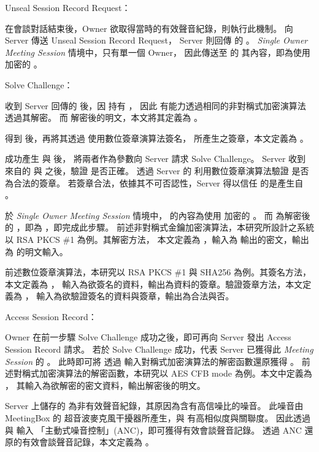 \begin{steps}
    \item Unseal Session Record Request：

            在會談對話結束後，Owner 欲取得當時的有效聲音紀錄，則執行此機制。
        \DEFowner 向 Server 傳送 Unseal Session Record Request，
        Server 則回傳 \DEFowner 的 \DEFakEnc。
        {\it Single Owner Meeting Session} 情境中，只有單一個 Owner，
        因此傳送至 \DEFowner 的 \DEFakEnc 其內容，即為使用 \DEFfuncEncPK 加密的 \DEFunsealKey。

    \item Solve Challenge：

            \DEFowner 收到 Server 回傳的 \DEFakEnc 後，因 \DEFowner 持有 \DEFprivateKey，
        因此 \DEFowner 有能力透過相同的非對稱式加密演算法透過其解密。
        而 \DEFakEnc 解密後的明文，本文將其定義為 \DEFakEncDec。

            得到 \DEFakEncDec 後，\DEFowner 再將其透過 \DEFprivateKey 使用數位簽章演算法簽名，
        所產生之簽章，本文定義為 \DEFakEncDecSig。

            \DEFowner 成功產生 \DEFakEncDec 與 \DEFakEncDecSig 後，
        將兩者作為參數向 Server 請求 Solve Challenge。
        Server 收到來自\DEFowner 的 \DEFakEncDec 與 \DEFakEncDecSig 之後，驗證 \DEFakEncDecSig 是否正確。
        透過 Server 的 \DEFpublicKey 利用數位簽章演算法驗證 \DEFakEncDecSig 是否為合法的簽章。
        若簽章合法，依據其不可否認性，Server 得以信任 \DEFakEncDec 的是產生自 \DEFowner。

            於 {\it Single Owner Meeting Session} 情境中，
        \DEFakEnc 的內容為使用 \DEFfuncEncPK 加密的 \DEFunsealKey。
        而 \DEFakEncDec 為解密後的 \DEFakEnc ，即為 \DEFunsealKey，即完成此步驟。
        前述非對稱式金鑰加密演算法，本研究所設計之系統以 RSA PKCS \#1 為例。其解密方法，
        本文定義為 \DEFfuncDecSK，輸入為 \DEFfuncEncPK 輸出的密文，輸出為 \DEFfuncEncPK 的明文輸入。

            前述數位簽章演算法，本研究以 RSA PKCS \#1 與 SHA256 為例。其簽名方法，本文定義為 \DEFfuncSignSK，
        輸入為欲簽名的資料，輸出為資料的簽章。驗證簽章方法，本文定義為 \DEFfuncVerfPK，
        輸入為欲驗證簽名的資料與簽章，輸出為合法與否。

    \item Access Session Record：

            Owner 在前一步驟 Solve Challenge 成功之後，即可再向 Server 發出 Access Session Record 請求。
        若於 Solve Challenge 成功，代表 Server 已獲得此 {\it Meeting Session} 的 \DEFunsealKey。
        此時即可將 \DEFrecN 透過 \DEFunsealKey 輸入對稱式加密演算法的解密函數還原獲得 \DEFrecN。
        前述對稱式加密演算法的解密函數，本研究以 AES CFB mode 為例。本文中定義為 \DEFfuncDecEK，
        其輸入為欲解密的密文資料，輸出解密後的明文。

            Server 上儲存的 \DEFrecJ 為非有效聲音紀錄，其原因為含有高信噪比的噪音。
        此噪音由 MeetingBox 的 超音波麥克風干擾器所產生，與 \DEFrecN 有高相似度與關聯度。
        因此透過 \DEFrecN 與 \DEFrecJ 輸入 「主動式噪音控制」(ANC)，即可獲得有效會談聲音記錄。
        透過 ANC 還原的有效會談聲音記錄，本文定義為 \DEFrecREV。
\end{steps}


